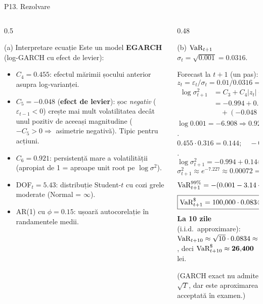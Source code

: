 \documentclass[9pt, aspectratio=169, t]{beamer}
\begin{document}
\begin{frame}[shrink=35]{P13. Rezolvare}
\begin{columns}[T]
\begin{column}{0.5\textwidth}
\begin{block}{(a) Interpretare ecuație}
Este un model \textbf{EGARCH} (log-GARCH cu efect de levier):
\begin{itemize}\setlength{\itemsep}{1pt}
    \item $C_4=0.455$: efectul mărimii șocului anterior asupra log-varianței.
    \item $C_5=-0.048$ (\textbf{efect de levier}): șoc \emph{negativ} ($\varepsilon_{t-1}<0$) crește mai mult volatilitatea decât unul pozitiv de aceeași magnitudine ($-C_5>0\Rightarrow$ asimetrie negativă). Tipic pentru acțiuni.
    \item $C_6=0.921$: persistență mare a volatilității (apropiat de 1 = aproape unit root pe $\log\sigma^2$).
    \item DOF$_t=5.43$: distribuție Student-$t$ cu cozi grele moderate (Normal = $\infty$).
    \item AR(1) cu $\phi=0.15$: ușoară autocorelație în randamentele medii.
\end{itemize}
\end{block}
\end{column}
\begin{column}{0.48\textwidth}
\begin{block}{(b) $\text{VaR}_{t+1}$}
$\sigma_t = \sqrt{0.001} = 0.0316$.

Forecast la $t+1$ (un pas):
\[
z_{t} = \varepsilon_t/\sigma_t = 0.01/0.0316 = 0.316
\]
\begin{align*}
\log\sigma_{t+1}^2 &= C_3 + C_4|z_t| + C_5 z_t + C_6\log\sigma_t^2\\
&= -0.994 + 0.455\!\cdot\!0.316 \\
&\quad + (-0.048)\!\cdot\!0.316 + 0.921\!\cdot\!\log(0.001)
\end{align*}
$\log 0.001 = -6.908 \Rightarrow 0.921\!\cdot\!(-6.908) = -6.362$.\\
$0.455\!\cdot\!0.316 = 0.144;\quad -0.048\!\cdot\!0.316 = -0.015$.
\[
\log\sigma_{t+1}^2 = -0.994 + 0.144 - 0.015 - 6.362 = -7.227
\]
\[
\sigma_{t+1}^2 \approx e^{-7.227} \approx 0.00072 \Rightarrow \sigma_{t+1} \approx 0.0269
\]
\[
\text{VaR}_{t+1}^{99\%} = -(0.001 - 3.14\cdot 0.0269) \approx 0.0834
\]
\[
\boxed{\text{VaR}_{t+1}^\$ = 100{,}000\cdot 0.0834 \approx \mathbf{8{,}340\ \text{lei}}}
\]
\textbf{La 10 zile} (i.i.d.\ approximare): $\text{VaR}_{t+10}\approx \sqrt{10}\cdot 0.0834 \approx 0.264$, deci $\text{VaR}_{t+10}^\$\approx\mathbf{26{,}400}$ lei.

(GARCH exact nu admite $\sqrt T$, dar este aproximarea acceptată în examen.)
\end{block}
\end{column}
\end{columns}
\end{frame}
\end{document}
